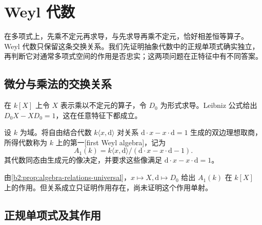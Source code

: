
\section{Weyl 代数}
\label{b2:sec:2002}

在多项式上，先乘不定元再求导，与先求导再乘不定元，恰好相差恒等算子。Weyl 代数只保留这条交换关系。我们先证明抽象代数中的正规单项式确实独立，再判断它对通常多项式空间的作用是否忠实；这两项问题在正特征中有不同答案。

%
%

\subsection{微分与乘法的交换关系}
\label{b2:subsec:2002:01}

在 \(k[X]\) 上令 \(X\) 表示乘以不定元的算子，令 \(D_0\) 为形式求导。Leibniz 公式给出 \(D_0X-XD_0=1\)，这在任意特征下都成立。

\begin{definition}\label{b2:def:first-weyl-algebra}
	设 \(k\) 为域。将自由结合代数 \(k\langle x,\mathrm{d}\rangle\) 对关系 \(\mathrm{d}\cdot x-x\cdot\mathrm{d}=1\) 生成的双边理想取商，所得代数称为 \(k\) 上的第一[first Weyl algebra]，记为
	\[
		A_1(k)=k\langle x,\mathrm{d}\rangle/(\mathrm{d}\cdot x-x\cdot\mathrm{d}-1).
	\]
	其代数同态由生成元的像决定，并要求这些像满足 \(\mathrm{d}\cdot x-x\cdot\mathrm{d}=1\)。
\end{definition}

由\cref{b2:prop:algebra-relations-universal}，\(x\mapsto X,\mathrm{d}\mapsto D_0\) 给出 \(A_1(k)\) 在 \(k[X]\) 上的作用。但关系成立只证明作用存在，尚未证明这个作用单射。

\subsection{正规单项式及其作用}
\label{b2:subsec:2002:02}

